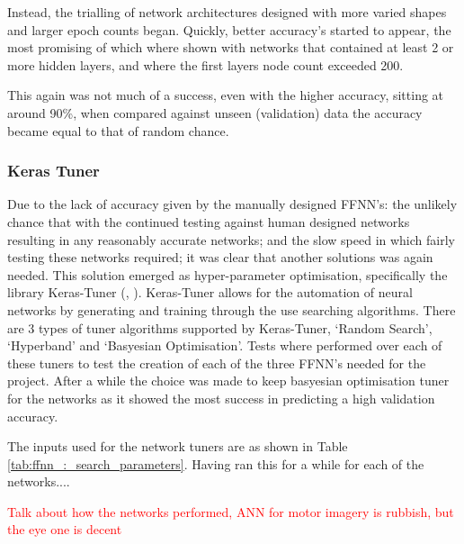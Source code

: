 \documentclass[11pt, a4paper]{article}
\newcommand{\commentintext}[1]
{\hfill 

\textcolor{red}{#1} 
	
\hfill
}
\newcommand{\ccite}[1]{(\citeauthor{#1}, \citeyear{#1})}
\newcommand{\reftable}[1]{Table \ref{#1}}
\begin{document}
Instead, the trialling of network architectures designed with more varied shapes and larger epoch counts began. Quickly, better accuracy's started to appear, the most promising of which where shown with networks that contained at least 2 or more hidden layers, and where the first layers node count exceeded 200.

This again was not much of a success, even with the higher accuracy, sitting at around 90\%, when compared against unseen (validation) data the accuracy became equal to that of random chance.


\subsubsection{Keras Tuner}
Due to the lack of accuracy given by the manually designed FFNN's: the unlikely chance that with the continued testing against human designed networks resulting in any reasonably accurate networks; and the slow speed in which fairly testing these networks required; it was clear that another solutions was again needed. This solution emerged as hyper-parameter optimisation, specifically the library Keras-Tuner \ccite{omalley2019kerastuner}. Keras-Tuner allows for the automation of neural networks by generating and training through the use searching algorithms. 
There are 3 types of tuner algorithms supported by Keras-Tuner, `Random Search', `Hyperband' and `Basyesian Optimisation'. Tests where performed over each of these tuners to test the creation of each of the three FFNN's needed for the project. After a while the choice was made to keep basyesian optimisation tuner for the networks as it showed the most success in predicting a high validation accuracy.

The inputs used for the network tuners are as shown in \reftable{tab:ffnn_:_search_parameters}. Having ran this for a while for each of the networks....

\commentintext{Talk about how the networks performed, ANN for motor imagery is rubbish, but the eye one is decent}
\end{document}
